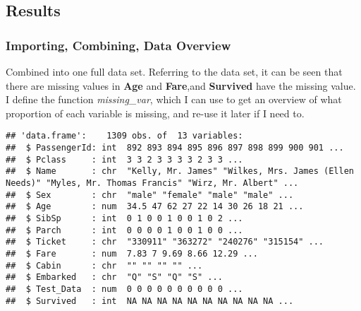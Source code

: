 \documentclass[
]{article}
\begin{document}
\hypertarget{results}{%
\subsection{\texorpdfstring{\textbf{Results}}{Results}}\label{results}}

\hypertarget{importing-combining-data-overview}{%
\subsubsection{\texorpdfstring{\textbf{Importing, Combining, Data
Overview}}{Importing, Combining, Data Overview}}\label{importing-combining-data-overview}}

Combined into one full data set. Referring to the data set, it can be
seen that there are missing values in \textbf{Age} and \textbf{Fare},and
\textbf{Survived} have the missing value. I define the function
\emph{missing\_var}, which I can use to get an overview of what
proportion of each variable is missing, and re-use it later if I need
to.

\begin{verbatim}
## 'data.frame':    1309 obs. of  13 variables:
##  $ PassengerId: int  892 893 894 895 896 897 898 899 900 901 ...
##  $ Pclass     : int  3 3 2 3 3 3 3 2 3 3 ...
##  $ Name       : chr  "Kelly, Mr. James" "Wilkes, Mrs. James (Ellen Needs)" "Myles, Mr. Thomas Francis" "Wirz, Mr. Albert" ...
##  $ Sex        : chr  "male" "female" "male" "male" ...
##  $ Age        : num  34.5 47 62 27 22 14 30 26 18 21 ...
##  $ SibSp      : int  0 1 0 0 1 0 0 1 0 2 ...
##  $ Parch      : int  0 0 0 0 1 0 0 1 0 0 ...
##  $ Ticket     : chr  "330911" "363272" "240276" "315154" ...
##  $ Fare       : num  7.83 7 9.69 8.66 12.29 ...
##  $ Cabin      : chr  "" "" "" "" ...
##  $ Embarked   : chr  "Q" "S" "Q" "S" ...
##  $ Test_Data  : num  0 0 0 0 0 0 0 0 0 0 ...
##  $ Survived   : int  NA NA NA NA NA NA NA NA NA NA ...
\end{verbatim}
\end{document}
